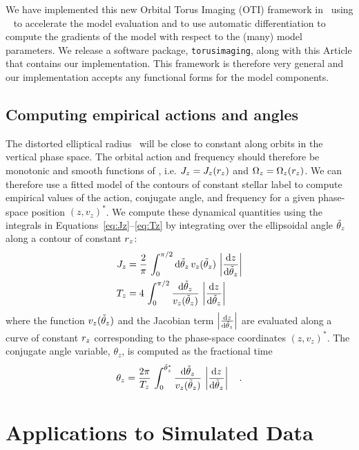 We have implemented this new Orbital Torus Imaging (OTI) framework in \python\ using
\jax\ \citep{jax:2018} to accelerate the model evaluation and to use automatic
differentiation to compute the gradients of the model with respect to the (many) model
parameters.
We release a software package, \texttt{torusimaging}, along with this Article that
contains our implementation.
This framework is therefore very general and our implementation accepts any functional
forms for the model components.


\subsection{Computing empirical actions and angles}
\label{sec:empirical-aaf}

The distorted elliptical radius \rz\ will be close to constant along orbits in the
vertical phase space.
The orbital action and frequency should therefore be monotonic and smooth functions of
\rz, i.e. $J_z = J_z(r_z)$ and $\Omega_z = \Omega_z(r_z)$.
We can therefore use a fitted model of the contours of constant stellar label to compute
empirical values of the action, conjugate angle, and frequency for a given phase-space
position $(z, v_z)^*$.
We compute these dynamical quantities using the integrals in
Equations~\ref{eq:Jz}--\ref{eq:Tz} by integrating over the ellipsoidal angle $\tilde{\theta}_z$
along a contour of constant $r_z$:
\begin{align}
    J_z &= \frac{2}{\pi} \, \int_0^{\pi/2} \mathrm{d} \tilde{\theta}_z \, v_z(\tilde{\theta}_z)
        \, \left|\frac{\mathrm{d} z}{\mathrm{d} \tilde{\theta}_z}\right| \label{eq:Jz-ell} \\
    T_z &= 4 \, \int_0^{\pi/2} \frac{\mathrm{d} \tilde{\theta}_z}{v_z(\tilde{\theta}_z)}
        \, \left|\frac{\mathrm{d} z}{\mathrm{d} \tilde{\theta}_z}\right| \label{eq:Tz-ell}
\end{align}
where the function $v_z(\tilde{\theta}_z)$ and the Jacobian term $\left|\frac{\mathrm{d} z}{\mathrm{d}
\tilde{\theta}_z}\right|$ are evaluated along a curve of constant $r_z$ corresponding to the
phase-space coordinates $(z, v_z)^*$.
The conjugate angle variable, $\theta_z$, is computed as the fractional time
\begin{equation}
    \theta_z = \frac{2\pi}{T_z} \, \int_0^{\tilde{\theta}_z^*} \frac{\mathrm{d} \tilde{\theta}_z}{v_z(\tilde{\theta}_z)}
        \, \left|\frac{\mathrm{d} z}{\mathrm{d} \tilde{\theta}_z}\right| \label{eq:thz-ell} \quad .
\end{equation}

\section{Applications to Simulated Data} \label{sec:applications-sim}

